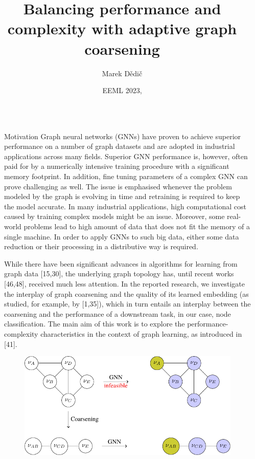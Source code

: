 \documentclass{beamer}
\title{Balancing performance and complexity with adaptive graph coarsening}
\date{EEML 2023, \displaydate{presentation}}
\author{Marek Dědič\inst{1, 2}}
\institute{
	\inst{1} Faculty of Nuclear Sciences and Physical Engineering, Czech Technical University in Prague \samelineand
	\inst{2} Cognitive Intelligence, Cisco Systems, Inc.
}
\newlength{\sepwidth}
\newlength{\colwidth}
\newcommand{\separatorcolumn}{\begin{column}{\sepwidth}\end{column}}
\begin{document}
\begin{frame}[t]

\begin{columns}[t]
	\separatorcolumn

	\begin{column}{\colwidth}
		\begin{block}{Motivation}
			Graph neural networks (GNNs) have proven to achieve superior performance on a number of graph datasets and are adopted in industrial applications across many fields. Superior GNN performance is, however, often paid for by a numerically intensive training procedure with a significant memory footprint. In addition, fine tuning parameters of a complex GNN can prove challenging as well. The issue is emphasised whenever the problem modeled by the graph is evolving in time and retraining is required to keep the model accurate. In many industrial applications, high computational cost caused by training complex models might be an issue. Moreover, some real-world problems lead to high amount of data that does not fit the memory of a single machine. In order to apply GNNs to such big data, either some data reduction or their processing in a distributive way is required.


	While there have been significant advances in algorithms for learning from graph data [15,30], the underlying graph topology has, until recent works [46,48], received much less attention. In the reported research, we investigate the interplay of graph coarsening and the quality of its learned embedding (as studied, for example, by [1,35]), which in turn entails an interplay between the coarsening and the performance of a downstream task, in our case, node classification. The main aim of this work is to explore the performance-complexity characteristics in the context of graph learning, as introduced in [41].

			\begin{figure}
				\includegraphics[width=\linewidth]{images/coarsening-illustration/coarsening-illustration.pdf}
			\end{figure}
		\end{block}


\end{column}
\end{columns}
\end{frame}
\end{document}
